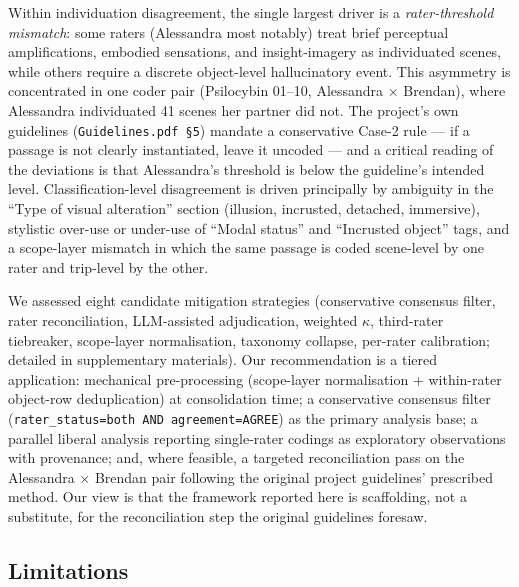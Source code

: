 Within individuation disagreement, the single largest driver is a \emph{rater-threshold mismatch}: some raters (Alessandra most notably) treat brief perceptual amplifications, embodied sensations, and insight-imagery as individuated scenes, while others require a discrete object-level hallucinatory event. This asymmetry is concentrated in one coder pair (Psilocybin 01--10, Alessandra × Brendan), where Alessandra individuated 41 scenes her partner did not. The project's own guidelines (\texttt{Guidelines.pdf \S5}) mandate a conservative Case-2 rule --- if a passage is not clearly instantiated, leave it uncoded --- and a critical reading of the deviations is that Alessandra's threshold is below the guideline's intended level. Classification-level disagreement is driven principally by ambiguity in the ``Type of visual alteration'' section (illusion, incrusted, detached, immersive), stylistic over-use or under-use of ``Modal status'' and ``Incrusted object'' tags, and a scope-layer mismatch in which the same passage is coded scene-level by one rater and trip-level by the other.

We assessed eight candidate mitigation strategies (conservative consensus filter, rater reconciliation, LLM-assisted adjudication, weighted $\kappa$, third-rater tiebreaker, scope-layer normalisation, taxonomy collapse, per-rater calibration; detailed in supplementary materials). Our recommendation is a tiered application: mechanical pre-processing (scope-layer normalisation + within-rater object-row deduplication) at consolidation time; a conservative consensus filter (\texttt{rater\_status=both AND agreement=AGREE}) as the primary analysis base; a parallel liberal analysis reporting single-rater codings as exploratory observations with provenance; and, where feasible, a targeted reconciliation pass on the Alessandra × Brendan pair following the original project guidelines' prescribed method. Our view is that the framework reported here is scaffolding, not a substitute, for the reconciliation step the original guidelines foresaw.

\subsection{Limitations}

